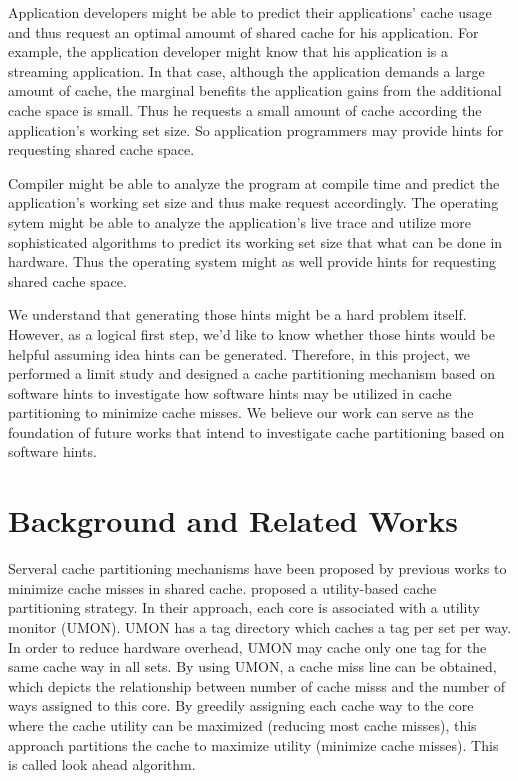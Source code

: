 \documentclass{acm_proc_article-sp}
\begin{document}
Application developers might be able to predict their applications' cache usage 
and thus request an optimal amoumt of shared cache for his application. For 
example, the application developer might know that his application is a 
streaming application. In that case, although the application demands a large 
amount of cache, the marginal benefits the application gains from the additional
cache space is small. Thus he requests a small amount of cache according the 
application's working set size. So application programmers may provide hints for
requesting shared cache space.

Compiler might be able to analyze the program at compile time and predict the 
application's working set size and thus make request accordingly. The operating
sytem might be able to analyze the application's live trace and utilize more 
sophisticated algorithms to predict its working set size that what can be done
in hardware. Thus the operating system might as well provide hints for 
requesting shared cache space.

We understand that generating those hints might be a hard problem itself. 
However, as a logical first step, we'd like to know whether those hints would 
be helpful assuming idea hints can be generated. Therefore, in this project, we 
performed a limit study and designed a cache partitioning mechanism based on 
software hints to investigate how software hints may be utilized in cache 
partitioning to minimize cache misses. We believe our work can serve as the 
foundation of future works that intend to investigate cache partitioning based
on software hints.

\section{Background and Related Works}

Serveral cache partitioning mechanisms have been proposed by previous works 
to minimize cache misses in shared cache.
\cite{Qureshi:2006:UCP:1194816.1194855} proposed a utility-based cache 
partitioning strategy. In their approach, each core is associated with a utility
monitor (UMON). UMON has a tag directory which caches a tag per set per way. 
In order to reduce hardware overhead, UMON may cache only one tag for the same 
cache way in all sets. By using UMON, a cache miss line can be obtained, which 
depicts the relationship between number of cache misss and the number of ways 
assigned to this core. By greedily assigning each cache way to the core where 
the cache utility can be maximized (reducing most cache misses), this approach
partitions the cache to maximize utility (minimize cache misses). This is called
look ahead algorithm.
\end{document}
